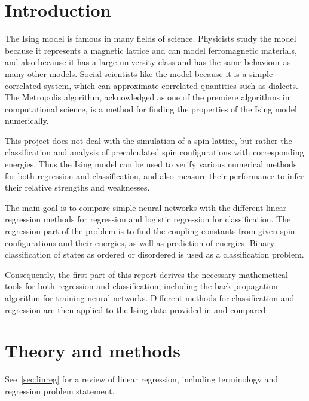 \documentclass[11pt,british,a4paper]{article}
\numberwithin{equation}{section}
\begin{document}
\tableofcontents

\section{Introduction}
The Ising model is famous in many fields of science.
Physicists study the model because it represents a magnetic lattice and can model ferromagnetic materials, and also because it has a large university class and has the same behaviour as many other models.
Social scientists like the model because it is a simple correlated system, which can approximate correlated quantities such as dialects.
The Metropolis algorithm, acknowledged as one of the premiere algorithms in computational science, is a method for finding the properties of the Ising model numerically.

This project does not deal with the simulation of a spin lattice, but rather the classification and analysis of precalculated spin configurations with corresponding energies.
Thus the Ising model can be used to verify various numerical methods for both regression and classification, and also measure their performance to infer their relative strengths and weaknesses.

The main goal is to compare simple neural networks with the different linear regression methods for regression and logistic regression for classification.
The regression part of the problem is to find the coupling constants from given spin configurations and their energies, as well as prediction of energies.
Binary classification of states as ordered or disordered is used as a classification problem.

Consequently, the first part of this report derives the necessary mathemetical tools for both regression and classification, including the back propagation algorithm for training neural networks. Different methods for classification and regression are then applied to the Ising data provided in\cite{mehta} and compared.

\section{Theory and methods}
See~\vref{sec:linreg} for a review of linear regression, including terminology and regression problem statement.
\end{document}
